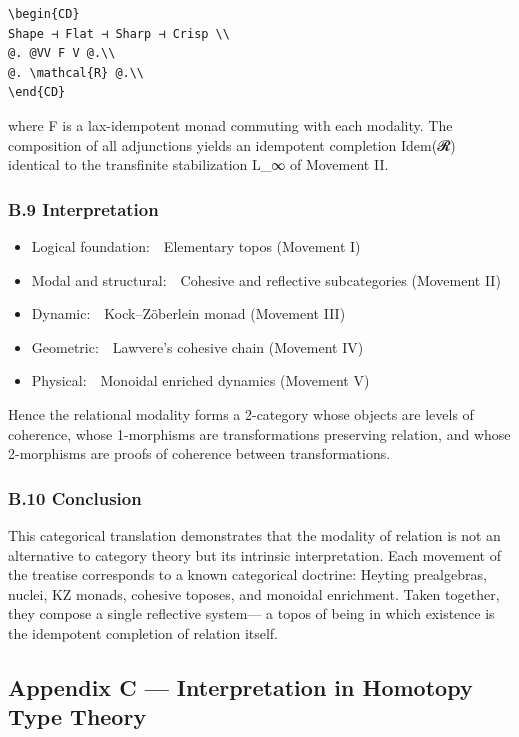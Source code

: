 \documentclass[11pt]{article}
\begin{document}
\begin{verbatim}
\begin{CD}
Shape ⊣ Flat ⊣ Sharp ⊣ Crisp \\
@. @VV F V @.\\
@. \mathcal{R} @.\\
\end{CD}
\end{verbatim}

where F is a lax-idempotent monad commuting with each modality.  
The composition of all adjunctions yields an idempotent completion Idem(𝓡)  
identical to the transfinite stabilization L\_∞ of Movement II.
\subsubsection*{B.9 Interpretation}
\label{sec:orga4c1933}
\begin{itemize}
\item Logical foundation: Elementary topos (Movement I)
\item Modal and structural: Cohesive and reflective subcategories (Movement II)
\item Dynamic: Kock–Zöberlein monad (Movement III)
\item Geometric: Lawvere’s cohesive chain (Movement IV)
\item Physical: Monoidal enriched dynamics (Movement V)
\end{itemize}

Hence the relational modality forms a 2-category  
whose objects are levels of coherence,  
whose 1-morphisms are transformations preserving relation,  
and whose 2-morphisms are proofs of coherence between transformations.
\subsubsection*{B.10 Conclusion}
\label{sec:orged2649d}
This categorical translation demonstrates that the modality of relation  
is not an alternative to category theory but its intrinsic interpretation.  
Each movement of the treatise corresponds to a known categorical doctrine:  
Heyting prealgebras, nuclei, KZ monads, cohesive toposes, and monoidal enrichment.  
Taken together, they compose a single reflective system—  
a topos of being in which existence is the idempotent completion of relation itself.
\subsection*{Appendix C — Interpretation in Homotopy Type Theory}
\label{sec:org02ecd68}
\end{document}
